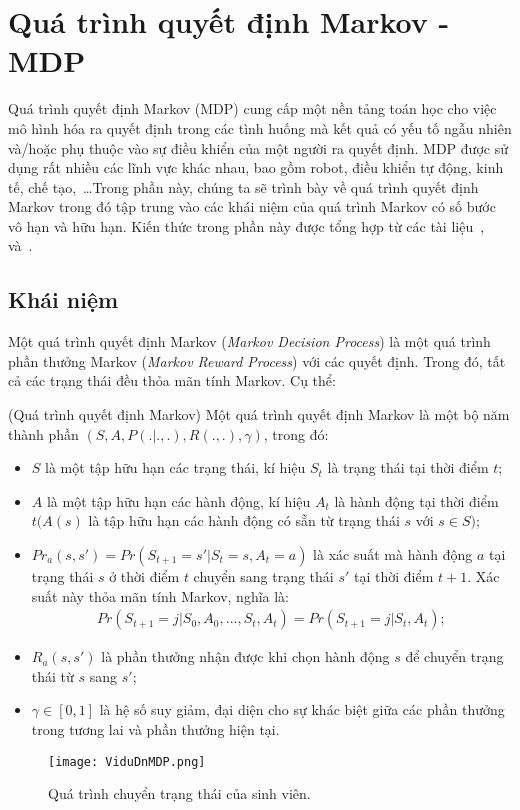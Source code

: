 \chapter{Quá trình quyết định Markov - MDP}
\label{ch:03}
Quá trình quyết định Markov (MDP) cung cấp một nền tảng toán học cho việc mô hình hóa ra quyết định trong các tình huống mà kết quả có yếu tố ngẫu nhiên và/hoặc phụ thuộc vào sự điều khiển của một người ra quyết định. MDP được sử dụng rất nhiều các lĩnh vực khác nhau, bao gồm robot, điều khiển tự động, kinh tế, chế tạo,~\dots Trong phần này, chúng ta sẽ trình bày về quá trình quyết định Markov trong đó tập trung vào các khái niệm của quá trình Markov có số bước vô hạn và hữu hạn. Kiến thức trong phần này được tổng hợp từ các tài liệu~\cite{Belman1957},~\cite{Sutton1999} và~\cite{Puterman1994}.
\section{Khái niệm}
Một quá trình quyết định Markov (\textit{Markov Decision Process}) là một quá trình phần thưởng Markov (\textit{Markov Reward Process}) với các quyết định. Trong đó, tất cả các trạng thái đều thỏa mãn tính Markov. Cụ thể:
\begin{dn}\rm
(Quá trình quyết định Markov) Một quá trình quyết định Markov là một bộ năm thành phần $(S,A,P(.|.,.),R(.,.),\gamma)$, trong đó:
\begin{itemize}
 \item $S$ là một tập hữu hạn các trạng thái, kí hiệu $S_t$ là trạng thái tại thời điểm $t$; 
 \item $A$ là một tập hữu hạn các hành động, kí hiệu $A_t$ là hành động tại thời điểm $t (A(s)$ là tập hữu hạn các hành động có sẵn từ trạng thái $s$ với $s\in S)$;
 \item $Pr_{a}(s,s')=Pr(S_{t+1}=s'|S_t=s,A_t=a)$ là xác suất mà hành động $a$ tại trạng thái $s$ ở thời điểm $t$ chuyển sang trạng thái $s'$ tại thời điểm $t+1$. Xác suất này thỏa mãn tính Markov, nghĩa là:
 \begin{align*}
 Pr(S_{t+1}=j|S_0,A_0,...,S_t,A_t)=Pr(S_{t+1}=j|S_t,A_t);
 \end{align*}
 \item $R_a(s,s')$ là phần thưởng nhận được khi chọn hành động $s$ để chuyển trạng thái từ $s$ sang $s'$;
 \item $\gamma \in [0,1]$ là hệ số suy giảm, đại diện cho sự khác biệt giữa các phần thưởng trong tương lai và phần thưởng hiện tại.
\end{itemize}
\begin{figure}[ht]
    \centering
    \begin{center}
    \texttt{[image: ViduDnMDP.png]}
    \end{center}    
    \caption{Quá trình chuyển trạng thái của sinh viên.}
    \label{fig:ViduDnMDP}
\end{figure}
\end{dn}
